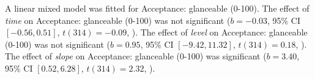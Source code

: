 A linear mixed model was fitted for Acceptance: glanceable (0-100).
The effect of \textit{time} on Acceptance: glanceable (0-100) was not significant ($b = -0.03$, 95\% CI $[-0.56, 0.51]$, $t(314) = -0.09$, ).
The effect of \textit{level} on Acceptance: glanceable (0-100) was not significant ($b = 0.95$, 95\% CI $[-9.42, 11.32]$, $t(314) = 0.18$, ).
The effect of \textit{slope} on Acceptance: glanceable (0-100) was significant ($b = 3.40$, 95\% CI $[0.52, 6.28]$, $t(314) = 2.32$, ).

